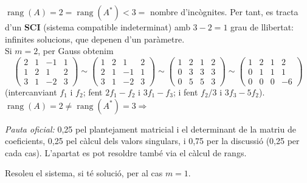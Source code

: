 \begin{apartats}
\begin{solucio}
$\operatorname{rang}(A)=2=\operatorname{rang}(A^*)<3=$ nombre d'incògnites. Per tant, es tracta d'un \textbf{SCI}
(sistema compatible indeterminat) amb $3-2=1$ grau de llibertat: infinites solucions, que depenen d'un paràmetre.\\
Si $m=2$, per Gauss obtenim
\[
\left(\begin{array}{ccc|c}2&1&-1&1\\1&2&1&2\\3&1&-2&3\end{array}\right)
\sim\left(\begin{array}{ccc|c}1&2&1&2\\2&1&-1&1\\3&1&-2&3\end{array}\right)
\sim\left(\begin{array}{ccc|c}1&2&1&2\\0&3&3&3\\0&5&5&3\end{array}\right)
\sim\left(\begin{array}{ccc|c}1&2&1&2\\0&1&1&1\\0&0&0&-6\end{array}\right)
\]
(intercanviant $f_1$ i $f_2$; fent $2f_1-f_2$ i $3f_1-f_3$; i fent $f_2/3$ i $3f_3-5f_2$).
$\operatorname{rang}(A)=2\neq\operatorname{rang}(A^*)=3\Rightarrow$ 

\textit{Pauta oficial:} 0,25 pel plantejament matricial i el determinant de la matriu de coeficients, 0,25 pel
càlcul dels valors singulars, i 0,75 per la discussió (0,25 per cada cas). L'apartat es pot resoldre també via el
càlcul de rangs.
\end{solucio}

Resoleu el sistema, si té solució, per al cas $m=1$.


\end{apartats}
